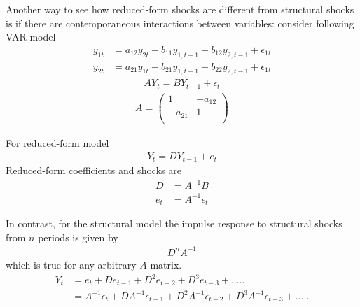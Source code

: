 \documentclass{beamer}
\begin{document}
\begin{frame}
 Another way to see how reduced-form shocks are different from structural shocks is if there are contemporaneous interactions between variables:
  consider following VAR model  
\begin{align}
  y_{1t} &= a_{12}y_{2t} + b_{11}y_{1,t-1} + b_{12}y_{2,t-1} +\epsilon_{1t}\\ \nonumber
  y_{2t} &= a_{21}y_{1t} + b_{21}y_{1,t-1} + b_{22}y_{2,t-1} +\epsilon_{1t}
\end{align}
  \begin{align}  
    AY_t = BY_{t-1} + \epsilon_t 
  \end{align}
  \begin{align}
   A= \begin{pmatrix}
      1 & -a_{12}\\ -a_{21} & 1 \\
    \end{pmatrix}
  \end{align}
\end{frame}

\begin{frame}
  For reduced-form model
  \begin{align}
    Y_t= DY_{t-1} + e_t
  \end{align}
  \medskip
  Reduced-form coefficients and shocks are
\begin{align}
  D &= A^{-1}B \\
  e_t &= A^{-1} \epsilon_t   
\end{align}
\end{frame}

\begin{frame}
  In contrast, for the structural model the impulse response to structural shocks from $n$ periods is given by
  \begin{align}
    D^nA^{-1}
  \end{align}
  which is true for any arbitrary $A$ matrix.
  \begin{align}
  Y_t&= e_t + De_{t-1} + D^2e_{t-2} + D^3e_{t-3} + .....\\ \nonumber
     &= A^{-1}\epsilon_t + DA^{-1}\epsilon_{t-1} + D^2A^{-1}\epsilon_{t-2} + D^3A^{-1}\epsilon_{t-3} + ..... \end{align}
\end{frame}
\end{document}

